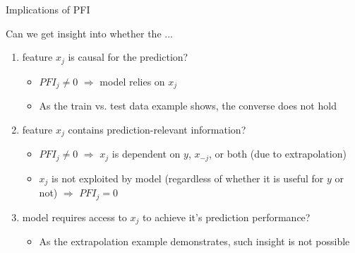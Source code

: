 \documentclass[11pt,compress,t,notes=noshow, aspectratio=169, xcolor=table]{beamer}
\begin{document}
\begin{frame}{Implications of PFI}

Can we get insight into whether the ...

\begin{enumerate}
    \item<1-> feature $x_j$ is causal for the prediction?
    \begin{itemize}
      \item $PFI_j \neq 0$ $\Rightarrow$ model relies on $x_j$
      \item As the train vs. test data example shows, the converse does not hold
    \end{itemize}
    \item<2-> feature $x_j$ contains prediction-relevant information?
    \begin{itemize}
      \item $PFI_j \neq 0$ $\Rightarrow$ $x_{j}$ is dependent on $y$, $x_{-j}$, or both (due to extrapolation) 
      \item $x_{j}$ is not exploited by model (regardless of whether it is useful for $y$ or not) $\Rightarrow$ $PFI_j = 0$  %
    \end{itemize}
    \item<3-> model requires access to $x_j$ to achieve it's prediction performance?    
    \begin{itemize}
      \item As the extrapolation example demonstrates, such insight is not possible
\end{itemize}
\end{enumerate}
\end{frame}


\end{document}
